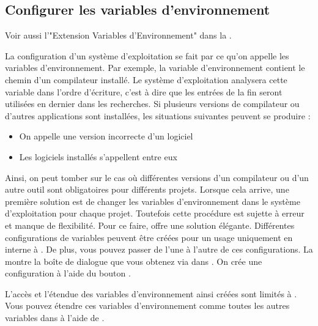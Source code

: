 \subsection{Configurer les variables  d'environnement}\label{sec:EnvVars_Cfg}

Voir aussi l'"Extension Variables d'Environnement" dans la .

La configuration d'un système d'exploitation se fait par ce qu'on appelle les variables d'environnement. Par exemple, la variable d'environnement  contient le chemin d'un compilateur installé. Le système d'exploitation analysera cette variable dans l'ordre d'écriture, c'est à dire que les entrées de la fin seront utilisées en dernier dans les recherches. Si plusieurs versions de compilateur ou d'autres applications sont installées, les situations suivantes peuvent se produire :

\begin{itemize}
\item On appelle une version incorrecte d'un logiciel
\item Les logiciels installés s'appellent entre eux
\end{itemize}

Ainsi, on peut tomber sur le cas où différentes versions d'un compilateur ou d'un autre outil sont obligatoires pour différents projets. Lorsque cela arrive, une première solution est de changer les variables d'environnement dans le système d'exploitation pour chaque projet. Toutefois cette procédure est sujette à erreur et manque de flexibilité. Pour ce faire, \codeblocks offre une solution élégante. Différentes configurations de variables peuvent être créées pour un usage uniquement en interne à \codeblocks. De plus, vous pouvez passer de l'une à l'autre de ces configurations. La  montre la boîte de dialogue que vous obtenez via  dans . On crée une configuration à l'aide du bouton .


L'accès et l'étendue des variables d'environnement ainsi créées sont limités à \codeblocks. Vous pouvez étendre ces variables d'environnement comme toutes les autres variables dans \codeblocks à l'aide de .



